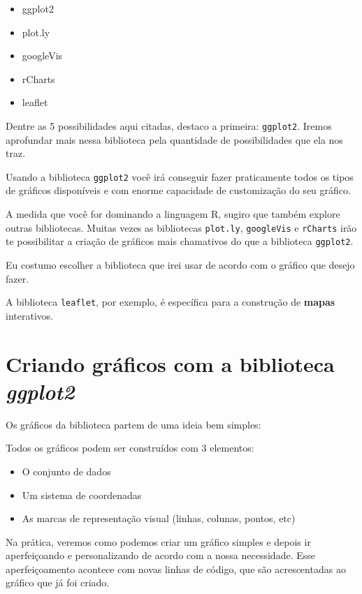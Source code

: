 \documentclass[
]{book}
\providecommand{\tightlist}{%
  \setlength{\itemsep}{0pt}\setlength{\parskip}{0pt}}
\begin{document}
\begin{itemize}
\tightlist
\item
  ggplot2
\item
  plot.ly
\item
  googleVis
\item
  rCharts
\item
  leaflet
\end{itemize}

Dentre as 5 possibilidades aqui citadas, destaco a primeira:
\texttt{ggplot2}. Iremos aprofundar mais nessa biblioteca pela
quantidade de possibilidades que ela nos traz.

Usando a biblioteca \texttt{ggplot2} você irá conseguir fazer
praticamente todos os tipos de gráficos disponíveis e com enorme
capacidade de customização do seu gráfico.

A medida que você for dominando a linguagem R, sugiro que também explore
outras bibliotecas. Muitas vezes as bibliotecas \texttt{plot.ly},
\texttt{googleVis} e \texttt{rCharts} irão te possibilitar a criação de
gráficos mais chamativos do que a biblioteca \texttt{ggplot2}.

Eu costumo escolher a biblioteca que irei usar de acordo com o gráfico
que desejo fazer.

A biblioteca \texttt{leaflet}, por exemplo, é específica para a
construção de \textbf{mapas} interativos.

\hypertarget{criando-gruxe1ficos-com-a-biblioteca-ggplot2}{%
\section{\texorpdfstring{Criando gráficos com a biblioteca
\emph{ggplot2}}{Criando gráficos com a biblioteca ggplot2}}\label{criando-gruxe1ficos-com-a-biblioteca-ggplot2}}

Os gráficos da biblioteca partem de uma ideia bem simples:

Todos os gráficos podem ser construídos com 3 elementos:

\begin{itemize}
\tightlist
\item
  O conjunto de dados
\item
  Um sistema de coordenadas
\item
  As marcas de representação visual (linhas, colunas, pontos, etc)
\end{itemize}

Na prática, veremos como podemos criar um gráfico simples e depois ir
aperfeiçoando e personalizando de acordo com a nossa necessidade. Esse
aperfeiçoamento acontece com novas linhas de código, que são
acrescentadas ao gráfico que já foi criado.
\end{document}
